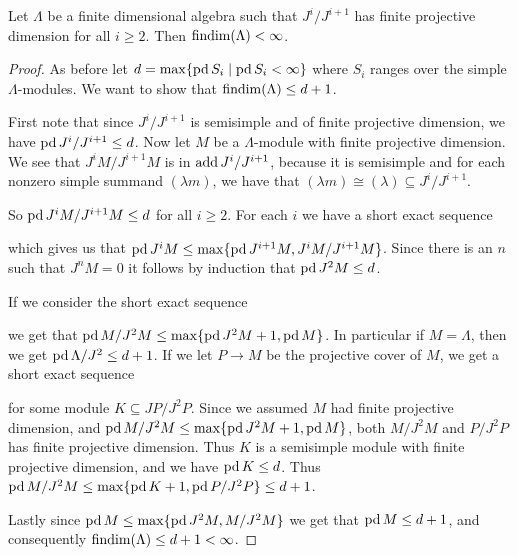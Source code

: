 \begin{theorem}\cite[Theorem~3.1]{Moc65}
	Let $\Lambda$ be a finite dimensional algebra such that $J^i/J^{i+1}$ has finite projective dimension for all $i \geq 2$. Then $\operatorname{findim}(\Lambda) < \infty$.
	\begin{proof}
		As before let $d = \max\{\operatorname{pd} S_i \mid \operatorname{pd} S_i < \infty\}$ where $S_i$ ranges over the simple $\Lambda$-modules. We want to show that $\operatorname{findim}(\Lambda) \leq d+1$.

		First note that since $J^i/J^{i+1}$ is semisimple and of finite projective dimension, we have $\operatorname{pd} J^i/J^{i+1} \leq d$. Now let $M$ be a $\Lambda$-module with finite projective dimension. We see that $J^iM/J^{i+1}M$ is in $\operatorname{add} J^i/J^{i+1}$, because it is semisimple and for each nonzero simple summand $(\lambda m)$, we have that $(\lambda m) \cong (\lambda) \subseteq J^i/J^{i+1}$.

		So $\operatorname{pd} J^iM/J^{i+1}M \leq d$ for all $i\geq 2$. For each $i$ we have a short exact sequence
		\begin{center}
		\end{center}
		which gives us that $\operatorname{pd} J^i M \leq \max\{ \operatorname{pd} J^{i+1}M, J^iM/J^{i+1}M \}$. Since there is an $n$ such that $J^n M = 0$ it follows by induction that $\operatorname{pd} J^2M \leq d$.

		If we consider the short exact sequence
		\begin{center}
		\end{center}
		we get that $\operatorname{pd} M/J^2M \leq \max\{\operatorname{pd} J^2M+1, \operatorname{pd} M\}$. In particular if $M=\Lambda$, then we get $\operatorname{pd} \Lambda/J^2 \leq d+1$. If we let $P \to M$ be the projective cover of $M$, we get a short exact sequence
		\begin{center}
		\end{center}
		for some module $K \subseteq JP/J^2P$. Since we assumed $M$ had finite projective dimension, and $\operatorname{pd} M/J^2M \leq \max\{\operatorname{pd} J^2M+1, \operatorname{pd} M\}$, both $M/J^2M$ and $P/J^2P$ has finite projective dimension. Thus $K$ is a semisimple module with finite projective dimension, and we have $\operatorname{pd} K \leq d$. Thus $\operatorname{pd} M/J^2M \leq \max\{\operatorname{pd} K + 1, \operatorname{pd} P/J^2P\} \leq d+1$.

		Lastly since $\operatorname{pd} M \leq \max\{\operatorname{pd} J^2M, M/J^2M\}$ we get that $\operatorname{pd} M \leq d+1$, and consequently $\operatorname{findim}(\Lambda) \leq d+1 < \infty$.
	\end{proof}
\end{theorem}

